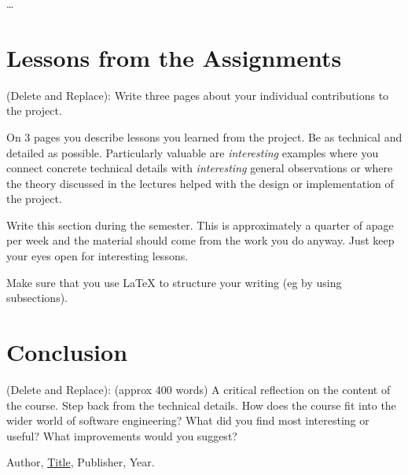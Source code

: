 \documentclass{article}
\theoremstyle{theorem}
\theoremstyle{definition}
\theoremstyle{remark}
\begin{document}
\ldots

\section{Lessons from the Assignments}

(Delete and Replace): Write three pages about your individual contributions to the project.

On 3 pages you describe lessons you learned from the project. Be as technical and detailed as possible. Particularly valuable are \emph{interesting} examples where you connect concrete technical details with \emph{interesting} general observations or where the theory discussed in the lectures helped with the design or implementation of the project.

Write this section during the semester. This is approximately a quarter of apage per week and the material should come from the work you do anyway. Just keep your eyes open for interesting lessons.

Make sure that you use \LaTeX{} to structure your writing (eg by using subsections).

\section{Conclusion}\label{conclusion}

(Delete and Replace): (approx 400 words) A critical reflection on the content of the course. Step back from the technical details. How does the course fit into the wider world of software engineering? What did you find most interesting or useful? What improvements would you suggest?

\begin{thebibliography}{99}
 Author, \href{https://en.wikipedia.org/wiki/LaTeX}{Title}, Publisher, Year.
\end{thebibliography}
\end{document}
